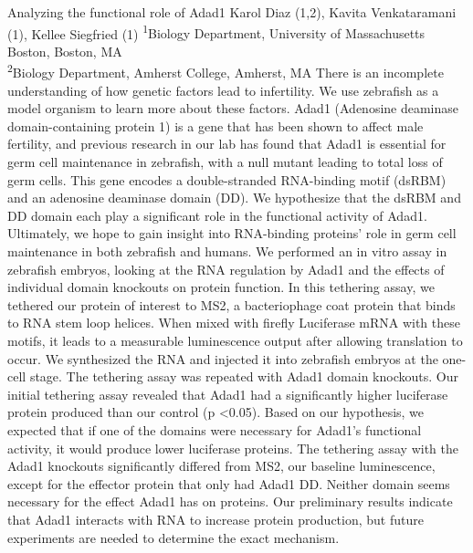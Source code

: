 \makeabstract
{
Analyzing the functional role of Adad1
}
{
Karol Diaz (1,2), Kavita Venkataramani (1), Kellee Siegfried (1)
}
{
\textsuperscript{1}Biology Department, University of Massachusetts Boston, Boston, MA\\
\textsuperscript{2}Biology Department, Amherst College, Amherst, MA
}
{
There is an incomplete understanding of how genetic factors lead to infertility. We use zebrafish as a model organism to learn more about these factors. Adad1 (Adenosine deaminase domain-containing protein 1) is a gene that has been shown to affect male fertility, and previous research in our lab has found that Adad1 is essential for germ cell maintenance in zebrafish, with a null mutant leading to total loss of germ cells. This gene encodes a double-stranded RNA-binding motif (dsRBM) and an adenosine deaminase domain (DD). We hypothesize that the dsRBM and DD domain each play a significant role in the functional activity of Adad1. Ultimately, we hope to gain insight into RNA-binding proteins’ role in germ cell maintenance in both zebrafish and humans. 
}
{
We performed an in vitro assay in zebrafish embryos, looking at the RNA regulation by Adad1 and the effects of individual domain knockouts on protein function. In this tethering assay, we tethered our protein of interest to MS2, a bacteriophage coat protein that binds to RNA stem loop helices. When mixed with firefly Luciferase mRNA with these motifs, it leads to a measurable luminescence output after allowing translation to occur. We synthesized the RNA and injected it into zebrafish embryos at the one-cell stage. The tethering assay was repeated with Adad1 domain knockouts. 
}
{
Our initial tethering assay revealed that Adad1 had a significantly higher luciferase protein produced than our control (p <0.05). Based on our hypothesis, we expected that if one of the domains were necessary for Adad1’s functional activity, it would produce lower luciferase proteins. The tethering assay with the Adad1 knockouts significantly differed from MS2, our baseline luminescence, except for the effector protein that only had Adad1 DD. 
}
{
Neither domain seems necessary for the effect Adad1 has on proteins. Our preliminary results indicate that Adad1 interacts with RNA to increase protein production, but future experiments are needed to determine the exact mechanism. 
}

\newpage
